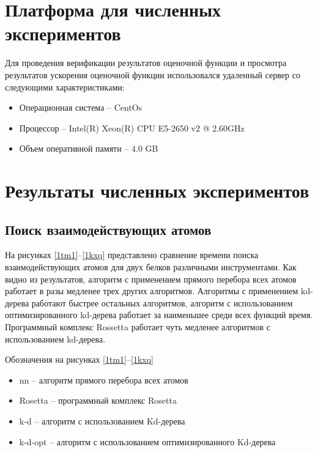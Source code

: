 \section{Платформа для численных экспериментов}


Для проведения верификации результатов оценочной функции и просмотра результатов ускорения оценочной функции использовался удаленный сервер со следующими характеристиками: 

\begin{itemize}
	\item Операционная система -- CentOs
	\item Процессор -- Intel(R) Xeon(R) CPU E5-2650 v2 @ 2.60GHz
	\item Объем оперативной памяти -- 4.0 GB
\end{itemize}


\section{Результаты численных экспериментов}

\subsection{Поиск взаимодействующих атомов}


На рисунках \ref{1tm1}--\ref{1kxq} представлено сравнение времени поиска взаимодействующих атомов для двух белков различными инструментами. Как видно из результатов, алгоритм с применением прямого перебора всех атомов работает в разы медленее трех других алгоритмов. Алгоритмы с применением kd-дерева работают быстрее остальных алгоритмов, алгоритм с использованием оптимизированного kd-дерева работает за наименьшее среди всех функций время. Программный комплекс Rossetta работает чуть медленее алгоритмов с использованием kd-дерева.

Обозначения на рисунках \ref{1tm1}--\ref{1kxq}
\begin{itemize}
	\item nn -- алгоритм прямого перебора всех атомов
	\item Rosetta -- программный комплекс Rosetta
	\item k-d -- алгоритм с использованием Kd-дерева
	\item k-d-opt -- алгоритм с использованием оптимизированного Kd-дерева
\end{itemize}

